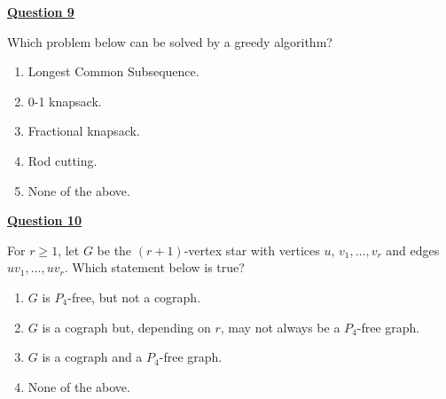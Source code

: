 \documentclass[10pt]{article}
\begin{document}
\bigskip
\noindent 
{\bf \underline{Question 9}}

\bigskip 
\noindent
Which problem below can be solved by a greedy algorithm?
\begin{enumerate}[{\bf (A)}]
\addtolength{\itemsep}{-5pt}
\item Longest Common Subsequence.
\item 0-1 knapsack.
\item Fractional knapsack.
\item Rod cutting.
\item None of the above.
\end{enumerate}

\bigskip
\noindent 
{\bf \underline{Question 10}}

\bigskip \noindent
For $r\geq 1$, let $G$ be the $(r+1)$-vertex star  with vertices $u$, $v_1,\ldots,v_r$ and edges $uv_1,\ldots,uv_r$. Which statement below is true?
\begin{enumerate}[{\bf (A)}]
\addtolength{\itemsep}{-5pt}
\item $G$ is $P_4$-free, but not a cograph.
\item $G$ is a cograph but, depending on $r$, may not always be a $P_4$-free graph.
\item $G$ is a cograph and a $P_4$-free graph.
\item None of the above.
\end{enumerate}
\end{document}
